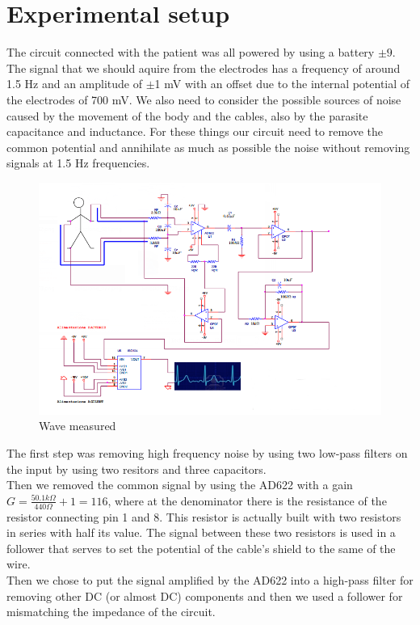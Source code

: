 \section{Experimental setup}
The circuit connected with the patient was all powered by using a battery $\pm 9$.\\
The signal that we should aquire from the electrodes has a frequency of around 1.5 Hz and an amplitude of $\pm$1 mV with an offset due to the internal potential of the electrodes of 700 mV. We also need to consider the possible sources of noise caused by the movement of the body and the cables, also by the parasite capacitance and inductance. For these things our circuit need to remove the common potential and annihilate as much as possible the noise without removing signals at 1.5 Hz frequencies.\\
\begin{figure}[H]
\centering
\includegraphics[width=.8\textwidth]{8/circuit.png}
\caption{Wave measured}
\end{figure}
The  first step was removing high frequency noise by using two low-pass filters on the input by using two resitors and three capacitors.\\

Then we removed the common signal by using the AD622 with a gain $G =   \frac{50.1 k\Omega}{440 \Omega} + 1 = 116$, where at the denominator there is the resistance of the resistor connecting pin 1 and 8. This resistor is actually built with two resistors in series with half its value. The signal between these two resistors is used in a follower that serves to set the potential of the cable's shield to the same of the wire.\\

Then we chose to put the signal amplified by the AD622 into a high-pass filter for removing other DC (or almost DC) components and then we used a follower for mismatching the impedance of the circuit.\\

